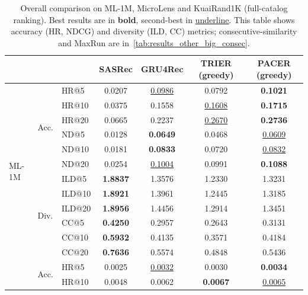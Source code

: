 \begin{table}[t]
\centering
\caption{Overall comparison on ML-1M, MicroLens and KuaiRand1K (full-catalog ranking).
Best results are in \textbf{bold}, second-best in \underline{underline}.
This table shows accuracy (HR, NDCG) and diversity (ILD, CC) metrics;
consecutive-similarity and MaxRun are in~\cref{tab:results_other_big_consec}.}
\label{tab:results_other_big_main}
\begin{tabular}{lllcccc}
\toprule
& & & SASRec & GRU4Rec & TRIER (greedy) & PACER (greedy) \\
\midrule
\multirow{12}{*}{ML-1M}
 & \multirow{6}{*}{Acc.}
 & HR@5  & 0.0207 & \underline{0.0986} & 0.0792 & \textbf{0.1021} \\
 & & HR@10 & 0.0375 & 0.1558 & \underline{0.1608} & \textbf{0.1715} \\
 & & HR@20 & 0.0665 & 0.2237 & \underline{0.2670} & \textbf{0.2736} \\
 & & ND@5  & 0.0128 & \textbf{0.0649} & 0.0468 & \underline{0.0609} \\
 & & ND@10 & 0.0181 & \textbf{0.0833} & 0.0720 & \underline{0.0832} \\
 & & ND@20 & 0.0254 & \underline{0.1004} & 0.0991 & \textbf{0.1088} \\
 & \multirow{6}{*}{Div.}
 & ILD@5  & \textbf{1.8837} & 1.3576 & 1.2330 & 1.3231 \\
 & & ILD@10 & \textbf{1.8921} & 1.3961 & 1.2445 & 1.3185 \\
 & & ILD@20 & \textbf{1.8956} & 1.4456 & 1.2914 & 1.3451 \\
 & & CC@5   & \textbf{0.4250} & 0.2957 & 0.2643 & 0.3131 \\
 & & CC@10  & \textbf{0.5932} & 0.4135 & 0.3571 & 0.4184 \\
 & & CC@20  & \textbf{0.7636} & 0.5574 & 0.4848 & 0.5436 \\
\addlinespace[0.4em]
\multirow{12}{*}{MicroLens}
 & \multirow{6}{*}{Acc.}
 & HR@5  & 0.0025 & \underline{0.0032} & 0.0030 & \textbf{0.0034} \\
 & & HR@10 & 0.0048 & 0.0062 & \textbf{0.0067} & \underline{0.0065} \\

\end{tabular}
\end{table}
